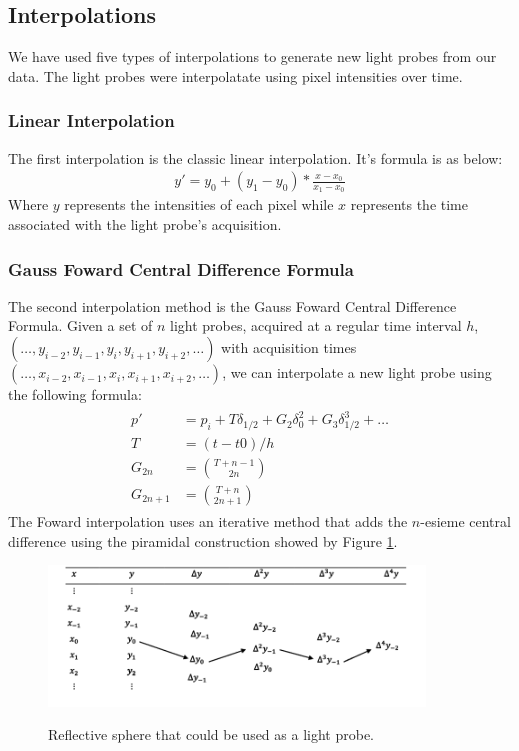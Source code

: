 \documentclass[conference]{acmsiggraph}
\begin{document}
\subsection{Interpolations}
	We have used five types of  interpolations to generate new light probes from our data. The light probes were interpolatate using pixel intensities over time.
\subsubsection{Linear Interpolation}
	The first interpolation is the classic linear interpolation. It's formula is as below: 
\begin{align}
	y' = y_0 + (y_1-y_0)*\frac{x-x_0}{x_1-x_0}
\end{align}
Where $y$ represents the intensities of each pixel while $x$ represents the time associated with the light probe's acquisition.

\subsubsection{Gauss Foward Central Difference Formula}
	The second interpolation method is the Gauss Foward Central Difference Formula. Given a set of $n$ light probes, acquired at a regular time interval $h$, 
$(\dots,y_{i-2},y_{i-1},y_i,y_{i+1},y_{i+2},\dots)$ with acquisition times $(\dots,x_{i-2},x_{i-1},x_i,x_{i+1},x_{i+2},\dots)$, we can interpolate a new
light probe using the following formula:
\begin{align}
\begin{split}
	p' &= p_i + T \delta_{1/2} + G_2 \delta_0^2 + G_3 \delta_{1/2}^3 + \dots\\
	T &= (t-t0)/h \\
	G_{2n} &= \binom{T+n-1}{2n} \\
	G_{2n+1} &= \binom{T+n}{2n+1}
\end{split}
\end{align}
	The Foward interpolation uses an iterative method that adds the $n$-esieme central difference\cite{abramowitz1972handbook} using the piramidal construction showed by Figure \ref{fig:fowardcentral}.

\begin{figure}[!ht]
	\caption{Reflective sphere that could be used as a light probe.}
	\centering
	\includegraphics[width=10cm]{images/forward.png}
	\label{fig:fowardcentral}
\end{figure}
\end{document}
